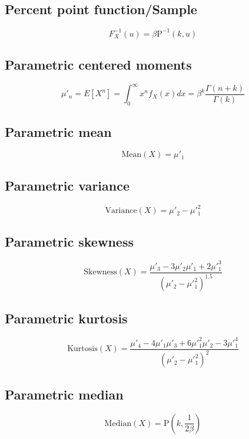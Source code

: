 \documentclass{article}
\begin{document}
\subsection{Percent point function/Sample}
\begin{equation*} F^{-1}_{X}\left(u\right)=\beta \text{P}^{-1}\left(k,u\right) \end{equation*}
\subsection{Parametric centered moments}
\begin{equation*} \mu'_{n}=E[X^n]=\int_{0}^{\infty}x^{n}f_{X}\left(x\right)dx=\beta^{k}\frac{\Gamma\left(n+k\right)}{\Gamma(k)} \end{equation*}
\subsection{Parametric mean}
\begin{equation*} \mathrm{Mean}(X)=\mu'_{1} \end{equation*}
\subsection{Parametric variance}
\begin{equation*} \mathrm{Variance}(X)=\mu'_{2}-\mu'^{2}_{1} \end{equation*}
\subsection{Parametric skewness}
\begin{equation*} \mathrm{Skewness}(X)=\frac{\mu'_{3}-3\mu'_{2}\mu'_{1}+2\mu'^{3}_{1}}{(\mu'_{2}-\mu'^{2}_{1})^{1.5}} \end{equation*}
\subsection{Parametric kurtosis}
\begin{equation*} \mathrm{Kurtosis}(X)=\frac{\mu'_{4}-4\mu'_{1}\mu'_{3}+6\mu'^{2}_{1}\mu'_{2}-3\mu'^{4}_{1}}{(\mu'_{2}-\mu'^{2}_{1})^{2}} \end{equation*}
\subsection{Parametric median}
\begin{equation*} \mathrm{Median}(X)=\text{P}(k,\frac{1}{2\beta}) \end{equation*}
\end{document}
